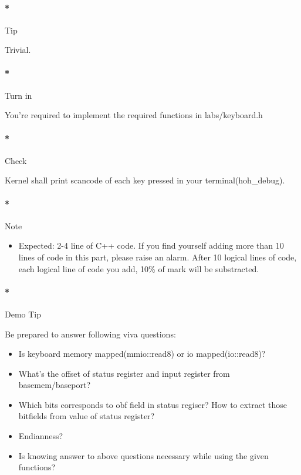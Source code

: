 \documentclass[]{article}
\providecommand{\tightlist}{%
  \setlength{\itemsep}{0pt}\setlength{\parskip}{0pt}}
\let\oldparagraph\paragraph
\renewcommand{\paragraph}[1]{\oldparagraph{#1}\mbox{}}
\begin{document}
\paragraph*{Tip}\label{tip-2}

Trivial.

\paragraph*{Turn in}\label{turn-in-2}

You're required to implement the required functions in labs/keyboard.h

\paragraph*{Check}\label{check-2}

Kernel shall print scancode of each key pressed in your
terminal(hoh\_debug).

\paragraph*{Note}\label{note-3}

\begin{itemize}
\tightlist
\item
  Expected: 2-4 line of C++ code. If you find yourself adding more than
  10 lines of code in this part, please raise an alarm. After 10 logical
  lines of code, each logical line of code you add, 10\% of mark will be
  substracted.
\end{itemize}

\paragraph*{Demo Tip}\label{demo-tip-2}

Be prepared to answer following viva questions:

\begin{itemize}
\tightlist
\item
  Is keyboard memory mapped(mmio::read8) or io mapped(io::read8)?
\item
  What's the offset of status register and input register from
  basemem/baseport?
\item
  Which bits corresponds to obf field in status regiser? How to extract
  those bitfields from value of status register?
\item
  Endianness?
\item
  Is knowing answer to above questions necessary while using the given
  functions?
\end{itemize}
\end{document}
